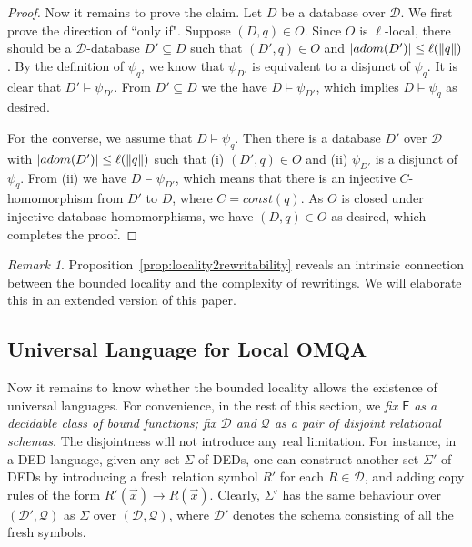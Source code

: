 \documentclass[letterpaper]{article} %
\theoremstyle{definition}
\theoremstyle{remark}
\newtheorem{rem}{Remark}
\theoremstyle{definition}
\begin{document}
\begin{proof}
Now it remains to prove the claim. Let $D$ be a database over $\mathscr{D}$. We first prove the direction of ``only if". Suppose $(D,{q})\in O$. Since $O$ is $\ell$-local, there should be a $\mathscr{D}$-database $D'\subseteq D$ such that $(D',q)\in O$ and $|adom(D')|\le\ell(\dl {q}\dl )$. By the definition of $\psi_{q}$, we know that $\psi_{D'}$ is equivalent to a disjunct of $\psi_{q}$. It is clear that $D'\models\psi_{D'}$. From $D'\subseteq D$ we the have $D\models\psi_{D'}$, which implies $D\models\psi_{q}$ as desired.

For the converse, we assume that $D\models\psi_{q}$. Then there is a database $D'$ over $\mathscr{D}$ with $|adom(D')|\le\ell(\dl {q}\dl )$ such that (i) $(D',q)\in O$ and (ii) $\psi_{D'}$ is a disjunct of $\psi_q$. From (ii) we have $D\models\psi_{D'}$, which means that there is an injective $C$-homomorphism from $D'$ to $D$, where $C=const(q)$.  As $O$ is closed under injective database homomorphisms, we have $(D,{q})\in O$ as desired, which completes the proof.
\end{proof}


\begin{rem}
Proposition~\ref{prop:locality2rewritability} reveals an intrinsic connection between the bounded locality and the complexity of rewritings. We will elaborate this in an extended version of this paper.
\end{rem}

\subsection{Universal Language for Local OMQA}

Now it remains to know whether the bounded locality allows the existence of universal languages. For convenience, in the rest of this section, we {\em fix $\mathsf{F}$ as a decidable class of bound functions; fix $\mathscr{D}$ and $\mathscr{Q}$ as a pair of disjoint relational schemas}. The disjointness will not introduce any real limitation. For instance, in a DED-language, given any set $\Sigma$ of DEDs, one can construct another set $\Sigma'$ of DEDs by introducing a fresh relation symbol $\textit{R}'$ for each $\textit{R}\in\mathscr{D}$, and adding copy rules of the form $\textit{R}'(\vec{x})\rightarrow\textit{R}(\vec{x})$. Clearly, $\Sigma'$ has the same behaviour over $(\mathscr{D}',\mathscr{Q})$ as $\Sigma$ over $(\mathscr{D},\mathscr{Q})$, where $\mathscr{D}'$ denotes the schema consisting of all the fresh symbols.
\end{document}
